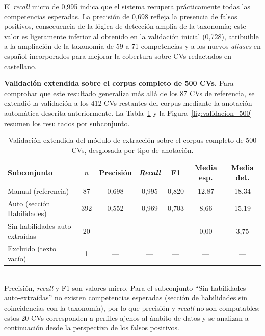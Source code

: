 El \textit{recall} micro de 0,995 indica que el sistema recupera prácticamente todas las competencias esperadas. La precisión de 0,698 refleja la presencia de falsos positivos, consecuencia de la lógica de detección amplia de la taxonomía; este valor es ligeramente inferior al obtenido en la validación inicial (0,728), atribuible a la ampliación de la taxonomía de 59 a 71 competencias y a los nuevos \textit{aliases} en español incorporados para mejorar la cobertura sobre CVs redactados en castellano.

\textbf{Validación extendida sobre el corpus completo de 500 CVs.} Para comprobar que este resultado generaliza más allá de los 87 CVs de referencia, se extendió la validación a los 412 CVs restantes del corpus mediante la anotación automática descrita anteriormente. La Tabla~\ref{tab:tabla3_6b} y la Figura~\ref{fig:validacion_500} resumen los resultados por subconjunto.

\begin{table}[H]
  \caption{Validación extendida del módulo de extracción sobre el corpus completo de 500 CVs, desglosada por tipo de anotación.}
  \label{tab:tabla3_6b}
  \centering
  \footnotesize
  \begin{tabular}{|l|c|c|c|c|c|c|}
    \hline
    \rowcolor{gray!15}
    \textbf{Subconjunto} & \textbf{$n$} & \textbf{Precisión} & \textbf{\textit{Recall}} & \textbf{F1} & \textbf{Media esp.} & \textbf{Media det.} \\
    \hline
    Manual (referencia)       & 87  & 0{,}698 & 0{,}995 & 0{,}820 & 12{,}87 & 18{,}34 \\
    \hline
    Auto (sección Habilidades) & 392 & 0{,}552 & 0{,}969 & 0{,}703 & 8{,}66  & 15{,}19 \\
    \hline
    Sin habilidades auto-extraídas & 20 & --- & --- & --- & 0{,}00 & 3{,}75 \\
    \hline
    Excluido (texto vacío)    & 1   & --- & --- & --- & --- & --- \\
    \hline
  \end{tabular}
  \\\smallskip
  {\footnotesize Precisión, \textit{recall} y F1 son valores micro. Para el subconjunto ``Sin habilidades auto-extraídas'' no existen competencias esperadas (sección de habilidades sin coincidencias con la taxonomía), por lo que precisión y \textit{recall} no son computables; estos 20 CVs corresponden a perfiles ajenos al ámbito de datos y se analizan a continuación desde la perspectiva de los falsos positivos.}
\end{table}

